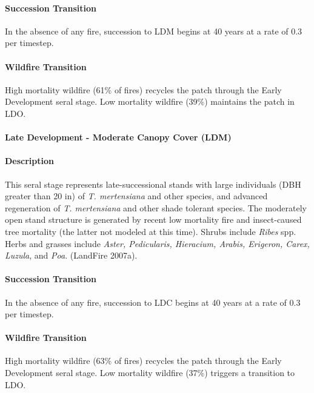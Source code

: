 \paragraph*{Succession Transition} In the absence of any fire, succession to LDM begins at 40 years at a rate of 0.3 per timestep.

\paragraph*{Wildfire Transition} High mortality wildfire (61\% of fires) recycles the patch through the Early Development seral stage. Low mortality wildfire (39\%) maintains the patch in LDO.

\noindent\hrulefill

\paragraph*{Late Development - Moderate Canopy Cover (LDM)}

\paragraph*{Description} This seral stage represents late-successional stands with large individuals (DBH greater than 20 in) of \emph{T. mertensiana} and other species, and advanced regeneration of \emph{T. mertensiana} and other shade tolerant species. The moderately open stand structure is generated by recent low mortality fire and insect-caused tree mortality (the latter not modeled at this time). Shrubs include \emph{Ribes} spp. Herbs and grasses include \emph{Aster, Pedicularis, Hieracium, Arabis, Erigeron, Carex, Luzula}, and \emph{Poa}. (LandFire 2007a).

\paragraph*{Succession Transition} In the absence of any fire, succession to LDC begins at 40 years at a rate of 0.3 per timestep.

\paragraph*{Wildfire Transition} High mortality wildfire (63\% of fires) recycles the patch through the Early Development seral stage. Low mortality wildfire (37\%) triggers a transition to LDO. 

\noindent\hrulefill

